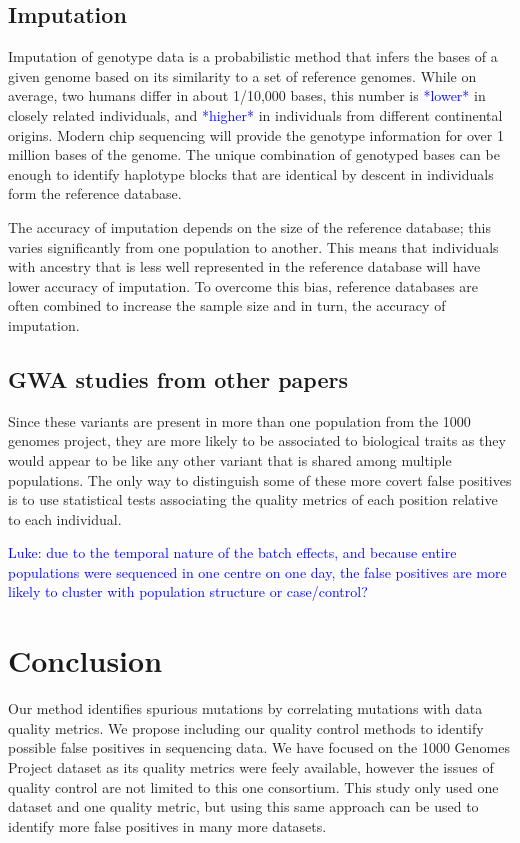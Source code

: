 \documentclass[9pt,lineno]{elife}
\newcommand{\luke}[1]{\textcolor{blue}{Luke: #1}}
\newcommand{\todo}[1]{\textcolor{blue}{*#1*}}
\begin{document}
\subsection{Imputation}
Imputation of genotype data is a probabilistic method that infers the bases of a given genome based on its similarity to a set of reference genomes.
While on average, two humans differ in about 1/10,000 bases, this number is \todo{lower} in closely related individuals, and \todo{higher} in individuals from different continental origins.
Modern chip sequencing will provide the genotype information for over 1 million bases of the genome.
The unique combination of genotyped bases can be enough to identify haplotype blocks that are identical by descent in individuals form the reference database.


The accuracy of imputation depends on the size of the reference database; this varies significantly from one population to another.
This means that individuals with ancestry that is less well represented in the reference database will have lower accuracy of imputation.
To overcome this bias, reference databases are often combined to increase the sample size and in turn, the accuracy of imputation.

\subsection{GWA studies from other papers}
Since these variants are present in more than one population from the 1000 genomes project, they are more likely to be associated to biological traits as they would appear to be like any other variant that is shared among multiple populations. 
The only way to distinguish some of these more covert false positives is to use statistical tests associating the quality metrics of each position relative to each individual. 

\luke{due to the temporal nature of the batch effects, and because entire populations were sequenced in one centre on one day, the false positives are more likely to cluster with population structure or case/control?}

			\section{Conclusion}
Our method identifies spurious mutations by correlating mutations with data quality metrics. 
We propose including our quality control methods to identify possible false positives in sequencing data. 
We have focused on the 1000 Genomes Project dataset as its quality metrics were feely available, however the issues of quality control are not limited to this one consortium. 
This study only used one dataset and one quality metric, but using this same approach can be used to identify more false positives in many more datasets. 
\end{document}
